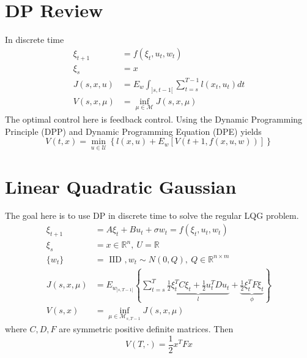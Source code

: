 
\mainmatter
\setcounter{page}{1}

\lectureseries[\course]{\course}

\date{October 13, 2009}

\setaddress

\setcounter{lecture}{4}
\setcounter{chapter}{4}


\section{DP Review}
In discrete time
\begin{align*}
\xi_{t+1} &= f(\xi_t,u_t,w_t) \\
\xi_s &= x \\
J(s,x,u) &= E_w\int_{]s,t-1[}\sum_{t=s}^{T-1}l(x_t,u_t)dt \\
V(s,x,\mu) &= \inf_{\mu\in\mathcal{M}}J(s,x,\mu)
\end{align*}
The optimal control here is feedback control. Using the Dynamic Programming Principle (DPP) and Dynamic Programming Equation (DPE) yields
$$V(t,x) = \min_{u\in\mathcal{U}}\left\lbrace l(x,u) + E_w[V(t+1,f(x,u,w))]\right\rbrace$$

\section{Linear Quadratic Gaussian}
The goal here is to use DP in discrete time to solve the regular LQG problem.
\begin{align*}
\xi_{t+1} &= A\xi_t + Bu_t + \sigma w_t = f(\xi_t,u_t,w_t) \\
\xi_s &= x \in \mathbb{R}^n, ~U=\mathbb{R} \\
\{w_t\} &= \text{ IID }, w_t\sim N(0,Q), ~Q\in\mathbb{R}^{n\times m} \\
J(s,x,\mu) &= E_{w_{]s,T-1[}} \left\lbrace \sum_{t=s}^T \underbrace{\frac{1}{2}\xi_t^T C \xi_t+\frac{1}{2}u_t^TDu_t}_{l} + \underbrace{\frac{1}{2}\xi_t^TF\xi_t}_{\phi} \right\rbrace \\
V(s,x) &= \inf_{\mu\in\mathcal{M}_{s,T-1}}J(s,x,\mu)
\end{align*}
where $C,D,F$ are symmetric positive definite matrices. Then
$$V(T,\cdot) = \frac{1}{2}x^TFx$$

